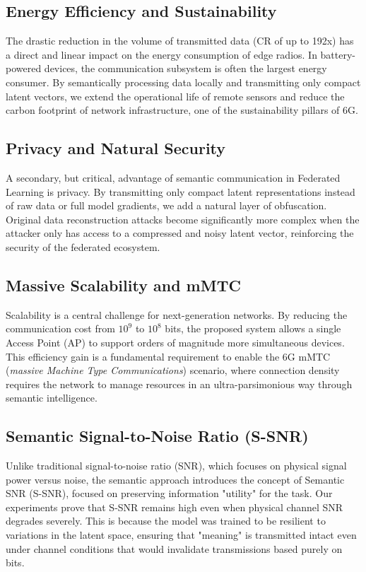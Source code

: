 \documentclass[conference,twocolumn]{IEEEtran}
\begin{document}
\subsection{Energy Efficiency and Sustainability}
The drastic reduction in the volume of transmitted data (CR of up to 192x) has a direct and linear impact on the energy consumption of edge radios. In battery-powered devices, the communication subsystem is often the largest energy consumer. By semantically processing data locally and transmitting only compact latent vectors, we extend the operational life of remote sensors and reduce the carbon footprint of network infrastructure, one of the sustainability pillars of 6G.

\subsection{Privacy and Natural Security}
A secondary, but critical, advantage of semantic communication in Federated Learning is privacy. By transmitting only compact latent representations instead of raw data or full model gradients, we add a natural layer of obfuscation. Original data reconstruction attacks become significantly more complex when the attacker only has access to a compressed and noisy latent vector, reinforcing the security of the federated ecosystem.

\subsection{Massive Scalability and mMTC}
Scalability is a central challenge for next-generation networks. By reducing the communication cost from $10^9$ to $10^8$ bits, the proposed system allows a single Access Point (AP) to support orders of magnitude more simultaneous devices. This efficiency gain is a fundamental requirement to enable the 6G mMTC (\textit{massive Machine Type Communications}) scenario, where connection density requires the network to manage resources in an ultra-parsimonious way through semantic intelligence.

\subsection{Semantic Signal-to-Noise Ratio (S-SNR)}
Unlike traditional signal-to-noise ratio (SNR), which focuses on physical signal power versus noise, the semantic approach introduces the concept of Semantic SNR (S-SNR), focused on preserving information "utility" for the task. Our experiments prove that S-SNR remains high even when physical channel SNR degrades severely. This is because the model was trained to be resilient to variations in the latent space, ensuring that "meaning" is transmitted intact even under channel conditions that would invalidate transmissions based purely on bits.
\end{document}
